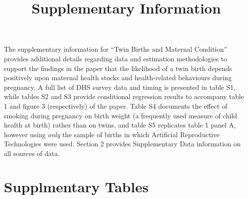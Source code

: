 \documentclass{nature}
\title{Supplementary Information}
\begin{document}
\maketitle

\begin{linenumbers}

The supplementary information for ``Twin Births and Maternal Condition'' provides additional details regarding data and estimation methodologies to support the findings in the paper that the likelihood of a twin birth depends positively upon maternal health stocks and health-related behaviours during pregnancy. A full list of DHS survey data and timing is presented in table S1, while tables S2 and S3 provide conditional regression results to accompany table 1 and figure 3 (respectively) of the paper.  Table S4 documents the effect of smoking during pregnancy on birth weight (a frequently used measure of child health at birth) rather than on twins, and table S5 replicates table 1 panel A, however using \emph{only} the sample of births in which Artificial Reproductive Technologies were used.  Section 2 provides Supplementary Data information on all sources of data.



\clearpage
\section{Supplmentary Tables}
\begin{spacing}{1}

 
\begin{landscape}

\end{landscape}


\end{spacing}
\end{linenumbers}
\end{document}
